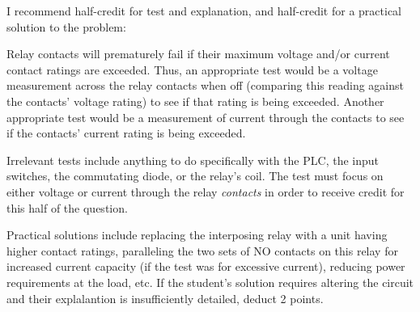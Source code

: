
I recommend half-credit for test and explanation, and half-credit for a practical solution to the problem:

\vskip 10pt

Relay contacts will prematurely fail if their maximum voltage and/or current contact ratings are exceeded.  Thus, an appropriate test would be a voltage measurement across the relay contacts when off (comparing this reading against the contacts' voltage rating) to see if that rating is being exceeded.  Another appropriate test would be a measurement of current through the contacts to see if the contacts' current rating is being exceeded.
 
\vskip 10pt

Irrelevant tests include anything to do specifically with the PLC, the input switches, the commutating diode, or the relay's coil.  The test must focus on either voltage or current through the relay {\it contacts} in order to receive credit for this half of the question.

\vskip 20pt

Practical solutions include replacing the interposing relay with a unit having higher contact ratings, paralleling the two sets of NO contacts on this relay for increased current capacity (if the test was for excessive current), reducing power requirements at the load, etc.  If the student's solution requires altering the circuit and their explalantion is insufficiently detailed, deduct 2 points.











